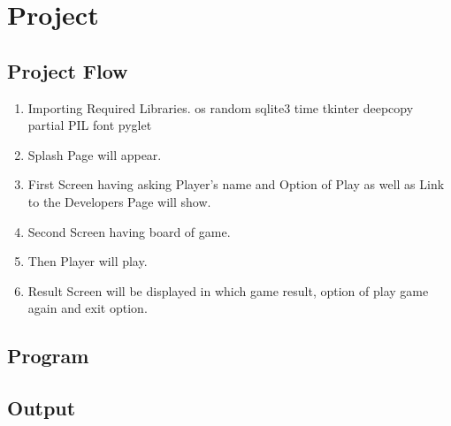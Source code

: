 \chapter{Project}
\section{Project Flow }
\begin{enumerate}
    \item Importing Required Libraries.
        \subitem os 
        \subitem random
        \subitem sqlite3
        \subitem time
        \subitem tkinter
        \subitem deepcopy
        \subitem partial
        \subitem PIL
        \subitem font
        \subitem pyglet
    \item Splash Page will appear.
    \item First Screen having asking Player's name and Option of Play as well as Link to the Developers Page will show.
    \item Second Screen having board of game.
    \item Then Player will play.
    \item Result Screen will be displayed in which game result, option of play game again and exit option. 
\end{enumerate}

\section{Program}


\section{Output}

